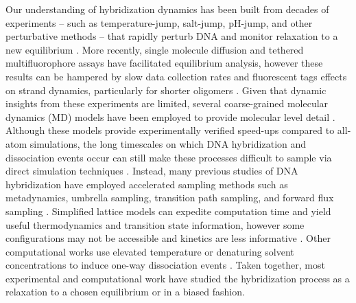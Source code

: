 \documentclass[journal=jpcbfk,manuscript=article]{achemso}
\begin{document}
Our understanding of hybridization dynamics has been built from decades of experiments -- such as temperature-jump, salt-jump, pH-jump, and other perturbative methods -- that rapidly perturb DNA and monitor relaxation to a new equilibrium \citep{Morrison1993SensitiveSolution, Wetmur1968KineticsDNA, Craig1971ElaxationOligon, Porschke1973ThermodynamicsPairs, Williams1989LaserDGCATGC, Narayanan2012ExploringMixing, Chen2007InfluenceHybridization, Sanstead2018DirectDehybridization}. More recently, single molecule diffusion and tethered multifluorophore assays have facilitated equilibrium analysis, however these results can be hampered by slow data collection rates and fluorescent tags effects on strand dynamics, particularly for shorter oligomers \citep{Liu20173DSolution,  Schickinger2018TetheredHelices, Chen2008Base-by-baseSpectroscopy, Dupuis2013Single-moleculeHelices, Morrison1993SensitiveSolution}. Given that dynamic insights from these experiments are limited, several coarse-grained molecular dynamics (MD) models have been employed to provide molecular level detail \citep{Romano2013DNADependence, Hinckley2013AnHybridization, Maciejczyk2014DNAModel, Markegard2015, Dans2016MultiscaleDNA}. Although these models provide experimentally verified speed-ups compared to all-atom simulations, the long timescales on which DNA hybridization and dissociation events occur can still make these processes difficult to sample via direct simulation techniques \citep{Phys2014}. Instead, many previous studies of DNA hybridization have employed accelerated sampling methods such as metadynamics, umbrella sampling,  transition path sampling, and forward flux sampling \citep{Schmitt2013ExploringSurface, Sambriski2009,  Hoefert2011MolecularOligonucleotides, Romano2013DNADependence}. Simplified lattice models can expedite computation time and yield useful thermodynamics and transition state information, however some configurations may not be accessible and kinetics are less informative \citep{Araque2016LatticeCooperativity, Phys2019}. Other computational works use elevated temperature or denaturing solvent concentrations to induce one-way dissociation events \citep{Wong2008TheSimulations, Perez2010Real-timeUnfolding}. Taken together, most experimental and computational work have studied the hybridization process as a relaxation to a chosen equilibrium or in a biased fashion.
\end{document}
